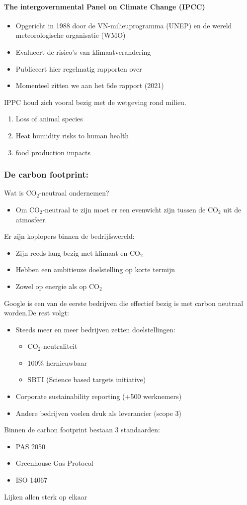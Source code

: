 \documentclass[12pt]{article}
\begin{document}
\paragraph{The intergovernmental Panel on Climate Change (IPCC)}
\begin{itemize}
    \item Opgericht in 1988 door de VN-milieuprogramma (UNEP) en de wereld meteorologische organisatie (WMO)
    \item Evalueert de risico's van klimaatverandering 
    \item Publiceert hier regelmatig rapporten over 
    \item Momenteel zitten we aan het 6de rapport (2021)
\end{itemize}
IPPC houd zich vooral bezig met de wetgeving rond milieu.
\begin{enumerate}
    \item Loss of animal species
    \item Heat humidity risks to human health
    \item food production impacts
\end{enumerate}
\subsubsection{De carbon footprint:}
Wat is CO$_2$-neutraal ondernemen?\begin{itemize}
    \item Om CO$_2$-neutraal te zijn moet er een evenwicht zijn tussen de CO$_2$ uit de atmosfeer.
\end{itemize}
Er zijn koplopers binnen de bedrijfswereld:\begin{itemize}
    \item Zijn reeds lang bezig met klimaat en CO$_2$
    \item Hebben een ambitieuze doelstelling op korte termijn 
    \item Zowel op energie als op CO$_2$
\end{itemize}
Google is een van de eerste bedrijven die effectief bezig is met carbon neutraal worden.De rest volgt:\begin{itemize}
    \item Steeds meer en meer bedrijven zetten doelstellingen:\begin{itemize}
        \item CO$_2$-neutraliteit
        \item 100\% hernieuwbaar
        \item SBTI (Science based targets initiative)
    \end{itemize}
    \item Corporate sustainability reporting (+500 werknemers)
    \item Andere bedrijven voelen druk als leverancier (scope 3)
\end{itemize}
Binnen de carbon footprint bestaan 3 standaarden:\begin{itemize}
    \item PAS 2050 
    \item Greenhouse Gas Protocol 
    \item ISO 14067
\end{itemize}
Lijken allen sterk op elkaar
\end{document}

